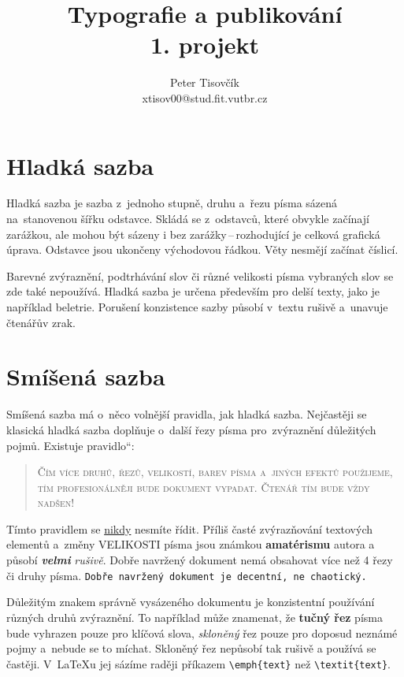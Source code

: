 \documentclass[11pt, a4paper, twocolumn] {article}
\title{Typografie a publikování \\ 1. projekt}
\author{Peter Tisovčík \\ xtisov00@stud.fit.vutbr.cz}
\date{} %
\newcommand{\myuv}[1]{\quotedblbase #1\textquotedblleft} %
\begin{document}
\maketitle
	
\section{Hladká sazba}    
Hladká sazba je sazba z~jednoho stupně, druhu a~řezu písma sázená na~stanovenou šířku odstavce. Skládá se z~odstavců, které obvykle začínají zarážkou, ale mohou být sázeny i bez zarážky\,--\,rozhodující je celková grafická úprava. Odstavce jsou ukončeny východovou řádkou. Věty nesmějí začínat číslicí.

Barevné zvýraznění, podtrhávání slov či různé velikosti písma vybraných slov se zde také nepoužívá. Hladká sazba je určena především pro delší texty, jako je například beletrie. Porušení konzistence sazby působí v~textu rušivě a~unavuje čtenářův zrak.

\section{Smíšená sazba}
Smíšená sazba má o~něco volnější pravidla, jak hladká sazba. Nejčastěji se klasická hladká sazba doplňuje o~další řezy písma pro~zvýraznění důležitých pojmů. Existuje \myuv{pravidlo}:

\begin{quotation}
\textsc{
Čím více druhů, řezů, velikostí, barev písma a~jiných efektů použijeme, tím profesionálněji bude dokument vypadat. Čtenář tím bude vždy nadšen!}
\end{quotation}

Tímto pravidlem se \underline{nikdy} nesmíte řídit. Příliš časté zvýrazňování textových elementů a~změny 
{\Huge V}{\huge E}{\LARGE L}{\Large I}{\large K}{\normalsize O}{\small S}{\footnotesize T}{\scriptsize I} písma {\Large jsou} {\LARGE známkou} {\bfseries{\huge amatérismu}} autora a
působí \textbf{\textit{velmi}} \emph{rušivě}. Dobře navržený dokument nemá obsahovat více než 4 řezy či druhy písma. \texttt{Dobře navržený dokument je decentní, ne chaotický.}

Důležitým znakem správně vysázeného dokumentu je konzistentní používání různých druhů zvýraznění. To například může znamenat, že \textbf{tučný řez} písma bude
vyhrazen pouze pro klíčová slova, \emph{skloněný} řez pouze pro doposud neznámé pojmy a~nebude se to míchat. Skloněný řez nepůsobí tak rušivě a používá se
častěji. V~\LaTeX u jej sázíme raději příkazem \verb|\emph{text}| než \verb|\textit{text}|. 
\end{document}
